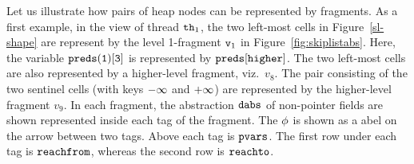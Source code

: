 Let us illustrate how pairs of heap nodes can be represented by fragments.
As a first example, in the view of thread ${\tt th}_1$, the two left-most cells
in Figure~\ref{sl-shape} are represent by the level 1-fragment $\mathtt{v}_1$ in
Figure~\ref{fig:skiplistabs}. Here, the variable $\tt preds(1)[3]$ is represented by $\tt preds[higher]$. The two left-most cells are also represented by
a higher-level fragment, viz.\ $v_8$.
The pair consisting of the two sentinel cells (with keys $\tt -\infty$ and $\tt +\infty$) are represented by the higher-level fragment $v_9$. In each fragment, the abstraction $\mathtt{dabs}$ of non-pointer fields are shown represented inside each tag of the fragment. The $\phi$ is shown as a abel on the  arrow between two tags. Above each tag is $\mathtt{pvars}$. The first row under each tag is $\mathtt{reachfrom}$, whereas the second row is $\mathtt{reachto}$.

 

